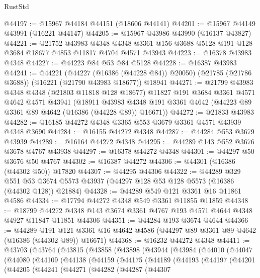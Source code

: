 \begin{lexlean}{RustStd}
\begin{coremodule}
@44197 := @15967 @44184 @44151 (@18606 @44141)
@44201 := @15967 @44149 @43991 (@16221 @44147)
@44205 := @15967 @43986 @43990 (@16137 @43827)
@44221 := @21752
    @43983
    @4348
    @4348
    @3361
    @156
    @3688
    @5128
    @191
    @128
    @3684
    @18677
    @4853
    @11817
    @4704
    @4571
    @43943
@44223 := @16378 @43983 @4348
@44227 := @44223 @84 @53 @84 @5128
@44228 := @16387 @43983
@44241 := @44221
    (@44227 (@16386 (@44228 @84)) @20050)
    (@21785 (@21786 @3688))
    (@16221 (@21790 @43983 @18677))
    @18941
@44271 := @21799
    @43983
    @4348
    @4348
    (@21803 @11818 @128 @18677)
    @11827
    @191
    @3684
    @3361
    @4571
    @4642
    @4571
    @43941
    (@18911 @43983 @4348 @191 @3361 @4642 (@44223 @89 @3361 @89 @4642 (@16386 (@44228 @89)) @16671))
@44272 := @21833 @43983
@44282 := @16185 @44272 @4348 @3365 @553 @3679 @3361 @4571 @43939 @4348 @3690
@44284 := @16155 @44272 @4348
@44287 := @44284 @553 @3679 @43939
@44289 := @16164 @44272 @4348
@44295 := @44289 @143 @552 @3676 @3678 @4767 @43938
@44297 := @16378 @44272 @4348
@44301 := @44297 @50 @3676 @50 @4767
@44302 := @16387 @44272
@44306 := @44301 (@16386 (@44302 @50)) @17820
@44307 := @44295 @44306
@44322 := @44289
    @329
    @551
    @53
    @3674
    @5573
    @43937
    (@44297 @128 @53 @128 @5573 (@16386 (@44302 @128)) @21884)
@44328 := @44289 @549 @121 @3361 @16 @11861 @4586
@44334 := @17794 @44272 @4348 @549 @3361 @11855 @11859
@44348 := @18799
    @44272
    @4348
    @143
    @3674
    @3361
    @4767
    @193
    @4571
    @4644
    @4348
    @4927
    @11847
    @11851
    @44306
@44351 := @44284 @193 @3674 @4644
@44366 := @44289
    @191
    @121
    @3361
    @16
    @4642
    @4586
    (@44297 @89 @3361 @89 @4642 (@16386 (@44302 @89)) @16671)
@44368 := @16232 @44272 @4348
@44411 := @43703
    (@43764
      (@43815
        (@43858
          (@43898
            (@43944
              (@43984
                (@44010
                  (@44047
                    (@44080
                      (@44109
                        (@44138
                          (@44159
                            (@44175
                              (@44189
                                (@44193
                                  (@44197
                                    (@44201
                                      (@44205
                                        (@44241
                                          (@44271
                                            (@44282
                                              (@44287
                                                (@44307

\end{coremodule}
\end{lexlean}
